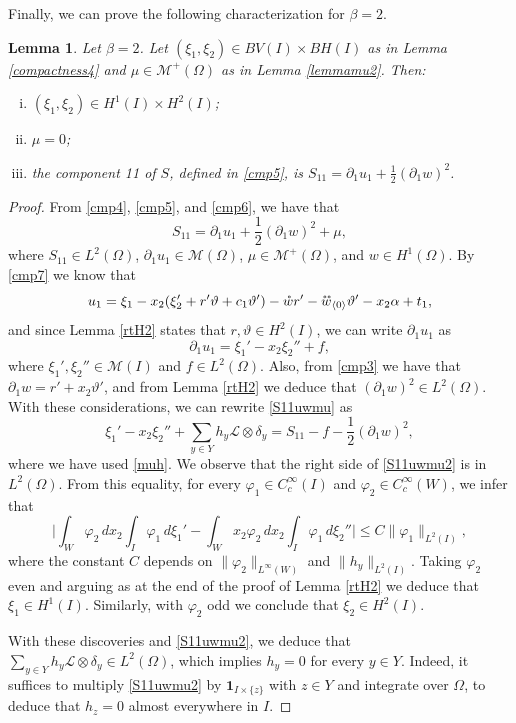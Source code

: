 \documentclass[a4, 11pt, reqno, final]{amsart}
\newcommand{\calL}{\mathcal{L}}
\newcommand{\calM}{\mathcal{M}}
\newcommand\ringring[1]{%
	{%
		\mathop{\kern0pt #1}\limits^{%
			\vbox to-1.85ex{
				\kern-2ex %
				\hbox to 0pt{\hss\normalfont\kern.1em \r{}\kern-.45em \r{}\hss}%
				\vss %
			}%
		}%
	}%
}
\theoremstyle{plain}%
\newtheorem{lemma}[theorem]{Lemma}
\newcommand{\QED}{\hspace{1ex}\hfill$\blacksquare$\vspace{2ex}}
\begin{document}
	Finally, we can prove the following characterization for $\beta=2$.
	\begin{lemma}\label{b2S11}
		Let $\beta = 2$. Let $(\xi_1, \xi_2) \in BV(I)\times BH(I)$ as in Lemma \ref{compactness4} and   $\mu\in \calM^+(\Omega)$ as in Lemma \ref{lemmamu2}.    Then:
		\begin{enumerate}[(i)]
			\item $(\xi_1, \xi_2) \in H^1(I)\times H^2(I)$;
			\item  $\mu = 0$;
			\item the component 11 of $S$, defined in \eqref{cmp5}, is
			$
			S_{11}=\partial_1 u_1+\frac 12 (\partial_1w)^2
			$.
		\end{enumerate}
	\end{lemma}
	\begin{proof}
		From \eqref{cmp4}, \eqref{cmp5}, and \eqref{cmp6}, we have that
		\begin{equation}\label{S11uwmu}
			S_{11}=\partial_1 u_1+\frac 12 (\partial_1w)^2 +\mu,
		\end{equation}
		where $S_{11} \in L^2(\Omega)$, $\partial_1 u_1\in \calM(\Omega)$, $\mu\in \calM^+(\Omega)$, and $w\in H^1(\Omega).$
		By \eqref{cmp7} we know that
		$$
		u_1=\xi_1 -x_2(\xi_2'+r'\vartheta + c_1\vartheta') - \mathring{w} r'   -\ringring{w}_{\langle 0 \rangle}\vartheta' - x_2\alpha + t_1,
		$$
		and since Lemma \ref{rtH2} states that $r,\vartheta\in H^2(I)$, we can write $\partial_1 u_1$ as
		$$
		\partial_1 u_1=\xi_1' -x_2\xi_2''+f,
		$$
		where $\xi_1',\xi_2''\in\calM(I)$ and $f\in L^2(\Omega)$.
		Also, from \eqref{cmp3} we have that $\partial_1 w=r'+x_2\vartheta'$, and  from Lemma \ref{rtH2} we deduce that $(\partial_1w)^2\in L^2(\Omega)$.
		With these considerations, we can rewrite \eqref{S11uwmu} as
		\begin{equation}\label{S11uwmu2}
			\xi_1' -x_2\xi_2'' +\sum_{y\in Y} h_y\calL\otimes \delta_y=S_{11}-f-\frac 12 (\partial_1w)^2,
		\end{equation}
		where we have used \eqref{muh}. We observe that the right side of \eqref{S11uwmu2} is in $L^2(\Omega)$.
		From this equality, for every
		$\varphi_1 \in C_c^\infty(I)$ and $\varphi_2 \in C_c^\infty(W)$, we infer that
		$$
		\Big|\int_W\varphi_2\,dx_2\int_I\varphi_1\,d\xi_1'-\int_Wx_2\varphi_2\,dx_2\int_I\varphi_1\,d\xi_2''
		\Big|\le C\|\varphi_1\|_{L^2(I)},
		$$
		where the constant $C$ depends on $\|\varphi_2\|_{L^\infty(W)}$ and $ \|h_y\|_{L^2(I)}$.
		Taking $\varphi_2$ even and arguing as at the end of the proof of Lemma \ref{rtH2} we deduce that
		$\xi_1\in H^1(I)$. Similarly, with $\varphi_2$ odd we conclude that $\xi_2\in H^2(I)$.

		With these discoveries and \eqref{S11uwmu2}, we deduce that $\sum_{y\in Y} h_y\calL\otimes \delta_y\in L^2(\Omega)$, which implies $h_y=0$ for every $y\in Y$. Indeed, it suffices to multiply
		\eqref{S11uwmu2} by $\mathbf{1}_{I\times \{z\}}$ with $z\in Y$ and integrate over $\Omega$, to deduce that $h_z=0$ almost everywhere in $I$.
	\end{proof}
\end{document}
